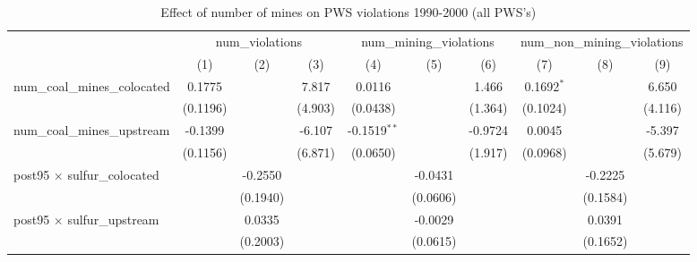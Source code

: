 
\begin{table}[htbp]
   \caption{\label{olsrf2sls_nummine_count_vio_1990to2000allhucs} Effect of number of mines on PWS violations 1990-2000 (all PWS's)}
   \bigskip
   \centering
   \begin{adjustbox}{width = \textwidth, center}
      \begin{tabular}{lccccccccc}
         \toprule
          & \multicolumn{3}{c}{num\_violations} & \multicolumn{3}{c}{num\_mining\_violations} & \multicolumn{3}{c}{num\_non\_mining\_violations}\\
                                                            & (1)           & (2)           & (3)           & (4)            & (5)           & (6)           & (7)           & (8)           & (9)\\  
         \midrule 
         num\_coal\_mines\_colocated                        & 0.1775        &               & 7.817         & 0.0116         &               & 1.466         & 0.1692$^{*}$  &               & 6.650\\   
                                                            & (0.1196)      &               & (4.903)       & (0.0438)       &               & (1.364)       & (0.1024)      &               & (4.116)\\   
         num\_coal\_mines\_upstream                         & -0.1399       &               & -6.107        & -0.1519$^{**}$ &               & -0.9724       & 0.0045        &               & -5.397\\   
                                                            & (0.1156)      &               & (6.871)       & (0.0650)       &               & (1.917)       & (0.0968)      &               & (5.679)\\   
         post95 $\times$ sulfur\_colocated                  &               & -0.2550       &               &                & -0.0431       &               &               & -0.2225       &   \\   
                                                            &               & (0.1940)      &               &                & (0.0606)      &               &               & (0.1584)      &   \\   
         post95 $\times$ sulfur\_upstream                   &               & 0.0335        &               &                & -0.0029       &               &               & 0.0391        &   \\   
                                                            &               & (0.2003)      &               &                & (0.0615)      &               &               & (0.1652)      &   \\   

\end{tabular}
\end{adjustbox}
\end{table}
